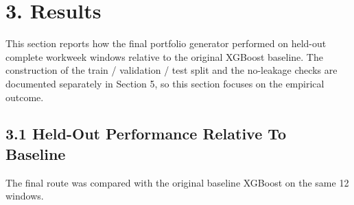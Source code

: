 \documentclass[11pt]{article}
\begin{document}
\section{3. Results}\label{results}

This section reports how the final portfolio generator performed on
held-out complete workweek windows relative to the original XGBoost
baseline. The construction of the train / validation / test split and
the no-leakage checks are documented separately in Section 5, so this
section focuses on the empirical outcome.

\subsection{3.1 Held-Out Performance Relative To
Baseline}\label{held-out-performance-relative-to-baseline}

The final route was compared with the original baseline XGBoost on the
same 12 windows.
\end{document}
